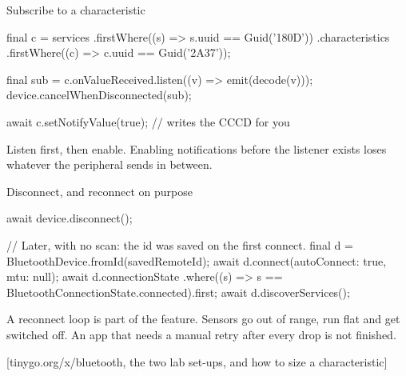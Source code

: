 \documentclass[10pt,aspectratio=169,t]{beamer}
\begin{document}
\begin{frame}[fragile,eyebrow=Flutter]{Subscribe to a characteristic}
  \vskip 1mm
\begin{dart}
final c = services
    .firstWhere((s) => s.uuid == Guid('180D'))
    .characteristics
    .firstWhere((c) => c.uuid == Guid('2A37'));

final sub = c.onValueReceived.listen((v) => emit(decode(v)));
device.cancelWhenDisconnected(sub);

await c.setNotifyValue(true);   // writes the CCCD for you
\end{dart}
  \begin{takeaway}{Listen first, then enable.}
    Enabling notifications before the listener exists loses whatever the peripheral sends in between.
  \end{takeaway}
\end{frame}

\begin{frame}[fragile,eyebrow=Flutter]{Disconnect, and reconnect on purpose}
  \vskip 1mm
\begin{dart}
await device.disconnect();

// Later, with no scan: the id was saved on the first connect.
final d = BluetoothDevice.fromId(savedRemoteId);
await d.connect(autoConnect: true, mtu: null);
await d.connectionState
    .where((s) => s == BluetoothConnectionState.connected).first;
await d.discoverServices();
\end{dart}
  \begin{takeaway}{A reconnect loop is part of the feature.}
    Sensors go out of range, run flat and get switched off. An app that needs a manual retry after every drop is not finished.
  \end{takeaway}
\end{frame}

[tinygo.org/x/bluetooth, the two lab set-ups, and how to size a characteristic]
\end{document}
